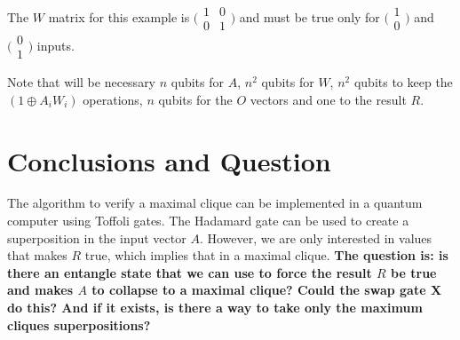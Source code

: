 \documentclass[a4paper,12pt]{article}
\begin{document}
The $W$ matrix for this example is $\bigl(\begin{smallmatrix}
1&0 \\ 0&1 \end{smallmatrix} \bigr)$ and must be true only for $\bigl(\begin{smallmatrix} 1\\0 \end{smallmatrix} \bigr)$ and $\bigl(\begin{smallmatrix} 0\\1 \end{smallmatrix} \bigr)$ inputs.

Note that will be necessary $n$ qubits for $A$, $n^2$ qubits for $W$, $n^2$ qubits to keep the $(1 \oplus A_i W_i)$ operations, $n$ qubits for the $O$ vectors and one to the result $R$.

\section{Conclusions and Question}

The algorithm to verify a maximal clique can be implemented in a quantum computer using Toffoli gates. The Hadamard gate can be used to create a superposition in the input vector $A$. However, we are only interested in values that makes $R$ true, which implies that in a maximal clique. \textbf{The question is: is there an entangle state that we can use to force the result $R$ be true and makes $A$ to collapse to a maximal clique? Could the swap gate X do this? And if it exists, is there a way to take only the maximum cliques superpositions?}
\end{document}
